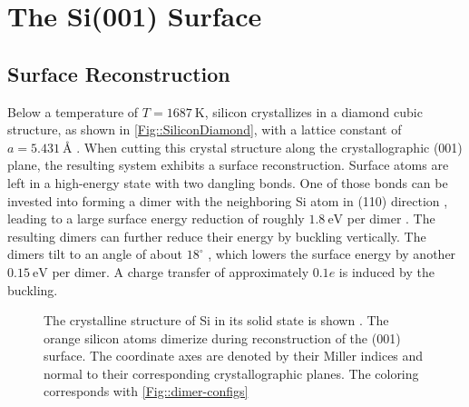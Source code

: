 	\chapter{The Si(001) Surface} \label{Section::Silicon}
	\section{Surface Reconstruction}
	Below a temperature of $T =	1687~\text{K}$, silicon crystallizes in a diamond cubic structure, as shown in \autoref{Fig::SiliconDiamond}, with a lattice constant of $a =	5.431~\text{\AA} $ \cite{tiesinga2021codata}. When cutting this crystal structure along the crystallographic (001) plane, the resulting system exhibits a surface reconstruction. Surface atoms are left in a high-energy state with two dangling bonds. One of those bonds can be invested into forming a dimer with the neighboring Si atom in (110) direction \cite{chadi1979atomic}, leading to a large surface energy reduction of roughly $1.8~\text{eV}$ per dimer \cite{ramstad1995theoretical, batra1990atomic, dabrowski1992self}.	The resulting dimers can further reduce their energy by buckling vertically. The dimers tilt to an angle of about $18^\circ$ \cite{ramstad1995theoretical, pillay2004revisit}, which lowers the surface energy by another $0.15~\text{eV}$ \cite{inoue1994order} per dimer. A charge transfer of approximately $0.1 e$  \cite{brand2023critical, landemark1992core} is induced by the buckling. \begin{figure}
		\centering
		
		\caption{The crystalline structure of Si in its solid state is shown \cite{sistrucure}.  The orange silicon atoms dimerize during reconstruction of the (001) surface. The coordinate axes are denoted by their Miller indices and normal to their corresponding crystallographic planes. The coloring corresponds with \autoref{Fig::dimer-configs}}
		\label{Fig::SiliconDiamond}
	\end{figure} \\
